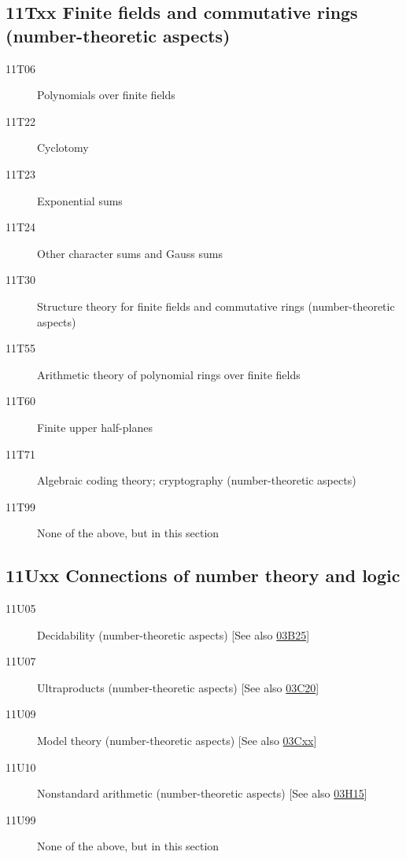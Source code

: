 \documentclass[letterpaper]{article}
\begin{document}
\subsection*{11Txx  Finite fields and commutative rings (number-theoretic aspects) }\label{11Txx}
\begin{description}  
\item [11T06]\label{11T06} Polynomials over finite fields
\item [11T22]\label{11T22} Cyclotomy
\item [11T23]\label{11T23} Exponential sums
\item [11T24]\label{11T24} Other character sums and Gauss sums
\item [11T30]\label{11T30} Structure theory for finite fields and commutative rings (number-theoretic aspects) 
\item [11T55]\label{11T55} Arithmetic theory of polynomial rings over finite fields
\item [11T60]\label{11T60} Finite upper half-planes
\item [11T71]\label{11T71} Algebraic coding theory; cryptography (number-theoretic aspects)
\item [11T99]\label{11T99} None of the above, but in this section
\end{description}
\subsection*{11Uxx  Connections of number theory and logic }\label{11Uxx}
\begin{description}  
\item [11U05]\label{11U05} Decidability (number-theoretic aspects) [See also \hyperref[03B25]{03B25}]
\item [11U07]\label{11U07} Ultraproducts (number-theoretic aspects) [See also \hyperref[03C20]{03C20}]
\item [11U09]\label{11U09} Model theory (number-theoretic aspects) [See also \hyperref[03Cxx]{03Cxx}]
\item [11U10]\label{11U10} Nonstandard arithmetic (number-theoretic aspects) [See also \hyperref[03H15]{03H15}]
\item [11U99]\label{11U99} None of the above, but in this section
\end{description}
\end{document}
